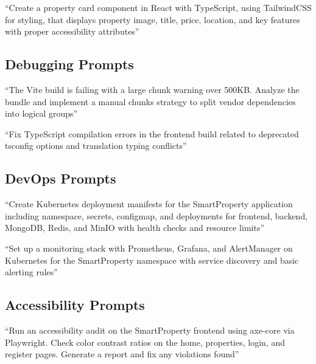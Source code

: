 \documentclass[12pt,a4paper]{article}
\begin{document}
\begin{promptbox}
``Create a property card component in React with TypeScript, using TailwindCSS for styling, that displays property image, title, price, location, and key features with proper accessibility attributes''
\end{promptbox}

\subsection{Debugging Prompts}

\begin{promptbox}
``The Vite build is failing with a large chunk warning over 500KB. Analyze the bundle and implement a manual chunks strategy to split vendor dependencies into logical groups''
\end{promptbox}

\begin{promptbox}
``Fix TypeScript compilation errors in the frontend build related to deprecated tsconfig options and translation typing conflicts''
\end{promptbox}

\subsection{DevOps Prompts}

\begin{promptbox}
``Create Kubernetes deployment manifests for the SmartProperty application including namespace, secrets, configmap, and deployments for frontend, backend, MongoDB, Redis, and MinIO with health checks and resource limits''
\end{promptbox}

\begin{promptbox}
``Set up a monitoring stack with Prometheus, Grafana, and AlertManager on Kubernetes for the SmartProperty namespace with service discovery and basic alerting rules''
\end{promptbox}

\subsection{Accessibility Prompts}

\begin{promptbox}
``Run an accessibility audit on the SmartProperty frontend using axe-core via Playwright. Check color contrast ratios on the home, properties, login, and register pages. Generate a report and fix any violations found''
\end{promptbox}
\end{document}
